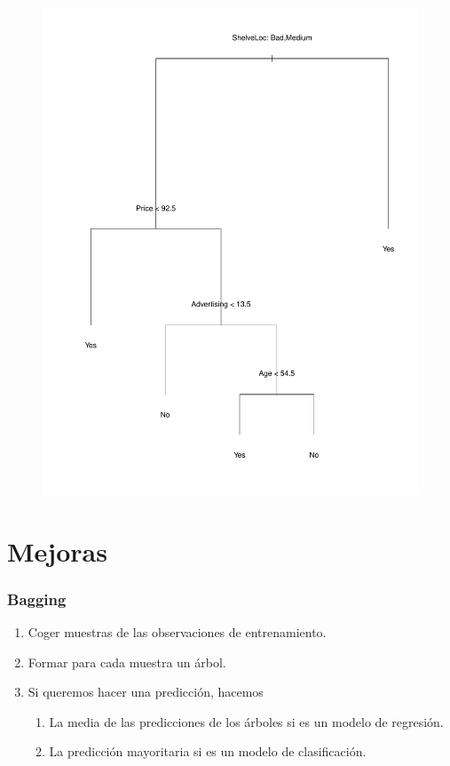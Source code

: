 \documentclass{beamer}
\theoremstyle{definition}
\begin{document}
\begin{frame}
\begin{figure}[h!]
\includegraphics[scale=0.28]{grafo1}
\end{figure}
\end{frame}

\section{Mejoras}
\begin{frame}
\frametitle{Bagging}
\begin{enumerate}
	\item<1-> Coger muestras de las observaciones de entrenamiento.
	\item<2-> Formar para cada muestra un árbol.
	\item<3-> Si queremos hacer una predicción, hacemos 
	\begin{enumerate}
		\item La media de las predicciones de los árboles si es un modelo de regresión.
		\item La predicción mayoritaria si es un modelo de clasificación.
	\end{enumerate}
\end{enumerate}
\end{frame}
\end{document}
